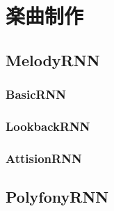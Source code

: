 \chapter{楽曲制作}
\section{MelodyRNN}
\subsection{BasicRNN}
\subsection{LookbackRNN}
\subsection{AttisionRNN}
\section{PolyfonyRNN}
